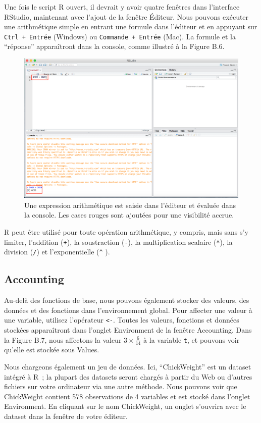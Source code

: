 \documentclass[
  12pt,
]{book}
\begin{document}
Une fois le script R ouvert, il devrait y avoir quatre fenêtres dans l'interface RStudio, maintenant avec l'ajout de la fenêtre Éditeur. Nous pouvons exécuter une arithmétique simple en entrant une formule dans l'éditeur et en appuyant sur \texttt{Ctrl\ +\ Entrée} (Windows) ou \texttt{Commande\ +\ Entrée} (Mac). La formule et la ``réponse'' apparaîtront dans la console, comme illustré à la Figure B.6.

\begin{figure}
\includegraphics[width=0.6\linewidth]{Images/first_addition} \caption{Une expression arithmétique est saisie dans l'éditeur et évaluée dans la console. Les cases rouges sont ajoutées pour une visibilité accrue.}\label{fig:firstaddition}
\end{figure}

R peut être utilisé pour toute opération arithmétique, y compris, mais sans s'y limiter, l'addition (\texttt{+}), la soustraction (\texttt{-}), la multiplication scalaire (\texttt{*}), la division (\texttt{/}) et l'exponentielle (\texttt{\^{}} ).

\hypertarget{accounting}{%
\subsection{Accounting}\label{accounting}}

Au-delà des fonctions de base, nous pouvons également stocker des valeurs, des données et des fonctions dans l'environnement global. Pour affecter une valeur à une variable, utilisez l'opérateur \texttt{\textless{}-}. Toutes les valeurs, fonctions et données stockées apparaîtront dans l'onglet Environment de la fenêtre Accounting. Dans la Figure B.7, nous affectons la valeur \(3 \times \frac{6}{14}\) à la variable \texttt{t}, et pouvons voir qu'elle est stockée sous Values.

Nous chargeons également un jeu de données. Ici, ``ChickWeight'' est un dataset intégré à R~; la plupart des datasets seront chargés à partir du Web ou d'autres fichiers sur votre ordinateur via une autre méthode. Nous pouvons voir que ChickWeight contient 578 observations de 4 variables et est stocké dans l'onglet Environment. En cliquant sur le nom ChickWeight, un onglet s'ouvrira avec le dataset dans la fenêtre de votre éditeur.
\end{document}
